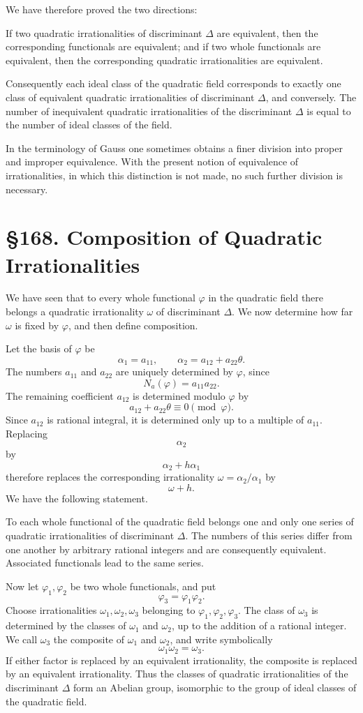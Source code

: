 \documentclass[11pt,a4paper]{book}
\newcommand{\webersection}[2]{\clearpage\section*{\S #1. #2}}
\begin{document}
We have therefore proved the two directions:

If two quadratic irrationalities of discriminant \(\Delta\) are equivalent, then the corresponding functionals are equivalent; and if two whole functionals are equivalent, then the corresponding quadratic irrationalities are equivalent.

Consequently each ideal class of the quadratic field corresponds to exactly one class of equivalent quadratic irrationalities of discriminant \(\Delta\), and conversely.  The number of inequivalent quadratic irrationalities of the discriminant \(\Delta\) is equal to the number of ideal classes of the field.

In the terminology of Gauss one sometimes obtains a finer division into proper and improper equivalence.  With the present notion of equivalence of irrationalities, in which this distinction is not made, no such further division is necessary.

\webersection{168}{Composition of Quadratic Irrationalities}

We have seen that to every whole functional \(\varphi\) in the quadratic field there belongs a quadratic irrationality \(\omega\) of discriminant \(\Delta\).  We now determine how far \(\omega\) is fixed by \(\varphi\), and then define composition.

Let the basis of \(\varphi\) be
\[
  \alpha_1=a_{11},\qquad
  \alpha_2=a_{12}+a_{22}\theta.
\tag{1}
\]
The numbers \(a_{11}\) and \(a_{22}\) are uniquely determined by \(\varphi\), since
\[
  N_a(\varphi)=a_{11}a_{22}.
\tag{2}
\]
The remaining coefficient \(a_{12}\) is determined modulo \(\varphi\) by
\[
  a_{12}+a_{22}\theta\equiv0\pmod{\varphi}.
\tag{3}
\]
Since \(a_{12}\) is rational integral, it is determined only up to a multiple of \(a_{11}\).  Replacing
\[
  \alpha_2
\]
by
\[
  \alpha_2+h\alpha_1
\]
therefore replaces the corresponding irrationality \(\omega=\alpha_2/\alpha_1\) by
\[
  \omega+h.
\]
We have the following statement.

To each whole functional of the quadratic field belongs one and only one series of quadratic irrationalities of discriminant \(\Delta\).  The numbers of this series differ from one another by arbitrary rational integers and are consequently equivalent.  Associated functionals lead to the same series.

Now let \(\varphi_1,\varphi_2\) be two whole functionals, and put
\[
  \varphi_3=\varphi_1\varphi_2.
\tag{4}
\]
Choose irrationalities \(\omega_1,\omega_2,\omega_3\) belonging to \(\varphi_1,\varphi_2,\varphi_3\).  The class of \(\omega_3\) is determined by the classes of \(\omega_1\) and \(\omega_2\), up to the addition of a rational integer.  We call \(\omega_3\) the composite of \(\omega_1\) and \(\omega_2\), and write symbolically
\[
  \omega_1\omega_2=\omega_3.
\tag{5}
\]
If either factor is replaced by an equivalent irrationality, the composite is replaced by an equivalent irrationality.  Thus the classes of quadratic irrationalities of the discriminant \(\Delta\) form an Abelian group, isomorphic to the group of ideal classes of the quadratic field.
\end{document}
